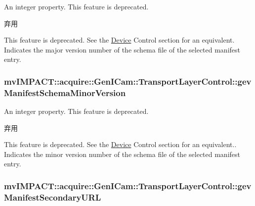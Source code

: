 An integer property. This feature is deprecated. 

\begin{DoxyRefDesc}{弃用}
\item[\hyperlink{deprecated__deprecated000090}{弃用}]This feature is deprecated. See the \hyperlink{classmv_i_m_p_a_c_t_1_1acquire_1_1_device}{Device} Control section for an equivalent. Indicates the major version number of the schema file of the selected manifest entry. \end{DoxyRefDesc}
\hypertarget{classmv_i_m_p_a_c_t_1_1acquire_1_1_gen_i_cam_1_1_transport_layer_control_a526c7ffd26f143f3e12500591ce67e14}{
\subsubsection[{gev\+Manifest\+Schema\+Minor\+Version}]{ mv\+I\+M\+P\+A\+C\+T\+::acquire\+::\+Gen\+I\+Cam\+::\+Transport\+Layer\+Control\+::gev\+Manifest\+Schema\+Minor\+Version}}\label{classmv_i_m_p_a_c_t_1_1acquire_1_1_gen_i_cam_1_1_transport_layer_control_a526c7ffd26f143f3e12500591ce67e14}


An integer property. This feature is deprecated. 

\begin{DoxyRefDesc}{弃用}
\item[\hyperlink{deprecated__deprecated000091}{弃用}]This feature is deprecated. See the \hyperlink{classmv_i_m_p_a_c_t_1_1acquire_1_1_device}{Device} Control section for an equivalent.. Indicates the minor version number of the schema file of the selected manifest entry. \end{DoxyRefDesc}
\hypertarget{classmv_i_m_p_a_c_t_1_1acquire_1_1_gen_i_cam_1_1_transport_layer_control_a45861368f934e515023577e0dfa49080}{
\subsubsection[{gev\+Manifest\+Secondary\+U\+R\+L}]{ mv\+I\+M\+P\+A\+C\+T\+::acquire\+::\+Gen\+I\+Cam\+::\+Transport\+Layer\+Control\+::gev\+Manifest\+Secondary\+U\+R\+L}}\label{classmv_i_m_p_a_c_t_1_1acquire_1_1_gen_i_cam_1_1_transport_layer_control_a45861368f934e515023577e0dfa49080}


